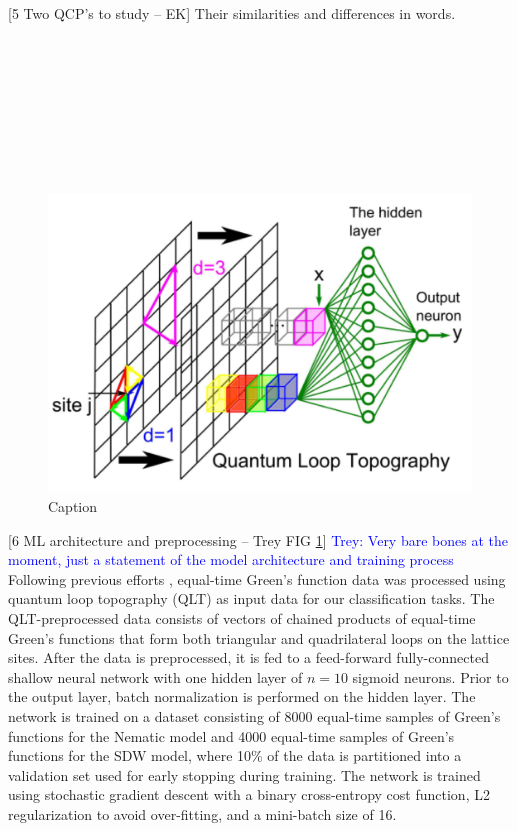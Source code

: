 \documentclass[amsmath,amssymb, aps, prx, longbibliography, twocolumn]{revtex4-1}
\begin{document}
[5 Two QCP's to study -- EK]
Their similarities and differences in words.
\\
\\
\\
\\
\\
\\
\\
\\
\\

 \begin{figure} [t]
    \centering
\includegraphics[width=.5\textwidth]{qlt.png}
    \caption{Caption}
    \label{fig:qlt}
\end{figure}
[6 ML architecture and preprocessing -- Trey FIG \ref{fig:qlt}]
\textcolor{blue}{Trey: Very bare bones at the moment, just a statement of the model architecture and training process}\\
Following previous efforts \cite{Zhang2019}, equal-time Green's function data was processed using quantum loop topography (QLT) as input data for our classification tasks. The QLT-preprocessed data consists of vectors of chained products of equal-time Green's functions that form both triangular and quadrilateral loops on the lattice sites. After the data is preprocessed, it is fed to a feed-forward fully-connected shallow neural network with one hidden layer of $n=10$ sigmoid neurons. Prior to the output layer, batch normalization is performed on the hidden layer. The network is trained on a dataset consisting of 8000 equal-time samples of Green's functions for the Nematic model and 4000 equal-time samples of Green's functions for the SDW model, where 10\% of the data is partitioned into a validation set used for early stopping during training. The network is trained using stochastic gradient descent with a binary cross-entropy cost function, L2 regularization to avoid over-fitting, and a mini-batch size of 16. \\
\end{document}
